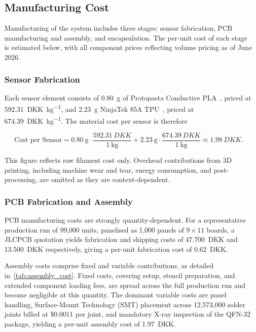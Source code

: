 \subsection{Manufacturing Cost} \label{sec:manufacturing_cost}
 
Manufacturing of the system includes three stages: sensor fabrication, PCB manufacturing and assembly, and encapsulation. The per-unit cost of each stage is estimated below, with all component prices reflecting volume pricing as of June 2026.
 
\subsubsection*{Sensor Fabrication}
 
Each sensor element consists of \SI{0.80}{\gram} of Protopasta Conductive PLA~\cite{protopasta_conductive_pla}, priced at \SI{592.31}{DKK\per\kilo\gram}, and \SI{2.23}{\gram} NinjaTek 85A TPU~\cite{ninjatek_ninjaflex_2026}, priced at \SI{674.39}{DKK\per\kilo\gram}. The material cost per sensor is therefore
 
\begin{equation}
    \text{Cost per Sensor} = \SI{0.80}{\gram} \cdot \frac{\SI{592.31}{DKK}}{\SI{1}{\kilo\gram}} + \SI{2.23}{\gram} \cdot \frac{\SI{674.39}{DKK}}{\SI{1}{\kilo\gram}} \approx \SI{1.98}{DKK}.
\end{equation}
 
\noindent This figure reflects raw filament cost only. Overhead contributions from 3D printing, including machine wear and tear, energy consumption, and post-processing, are omitted as they are context-dependent.
 
\subsubsection*{PCB Fabrication and Assembly}
 
PCB manufacturing costs are strongly quantity-dependent. For a representative production run of 99{,}000 units, panelised as 1{,}000 panels of $9 \times 11$ boards, a JLCPCB quotation yields fabrication and shipping costs of \SI{47,700}{DKK} and \SI{13,500}{DKK} respectively, giving a per-unit fabrication cost of \SI{0.62}{DKK}.
 
Assembly costs comprise fixed and variable contributions, as detailed in~\cref{tab:assembly_cost}. Fixed costs, covering setup, stencil preparation, and extended component loading fees, are spread across the full production run and become negligible at this quantity. The dominant variable costs are panel handling, Surface-Mount Technology (SMT) placement across 12{,}573{,}000 solder joints billed at \$0.0011 per joint, and mandatory X-ray inspection of the QFN-32 package, yielding a per-unit assembly cost of \SI{1.97}{DKK}.
 
